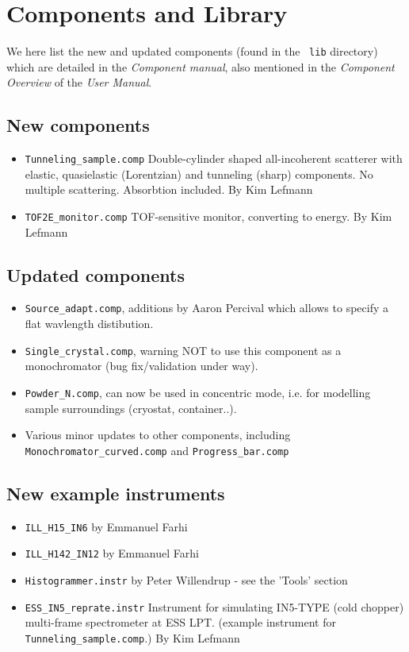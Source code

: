 \section{Components and Library}
\label{s:new-features:components}
 
We here list the new and updated components (found in the \MCS\ \verb+lib+ directory)
which are detailed in the {\it Component manual}, also mentioned in
the {\it Component Overview} of the {\it User Manual}.
\subsection{New components}
\begin{itemize}
\item \verb+Tunneling_sample.comp+ Double-cylinder shaped all-incoherent scatterer with elastic, quasielastic (Lorentzian)
  and tunneling (sharp) components. No multiple scattering. Absorbtion included. By Kim Lefmann
\item \verb+TOF2E_monitor.comp+ TOF-sensitive monitor, converting to energy. By Kim Lefmann
\end{itemize}
\subsection{Updated components}
\begin{itemize}
\item \verb+Source_adapt.comp+, additions by Aaron Percival which allows to specify a flat wavlength distibution.
\item \verb+Single_crystal.comp+, warning NOT to use this component as a monochromator (bug fix/validation under way).
\item \verb+Powder_N.comp+, can now be used in concentric mode, i.e. for modelling sample surroundings (cryostat, container..).
\item Various minor updates to other components, including \verb+Monochromator_curved.comp+ and \verb+Progress_bar.comp+
\end{itemize}
\subsection{New example instruments}
\begin{itemize}
  \item \verb+ILL_H15_IN6+ by Emmanuel Farhi
  \item \verb+ILL_H142_IN12+ by Emmanuel Farhi
  \item \verb+Histogrammer.instr+ by Peter Willendrup - see the 'Tools' section
  \item \verb+ESS_IN5_reprate.instr+ Instrument for simulating IN5-TYPE (cold chopper) multi-frame spectrometer at ESS LPT.
    (example instrument for \verb+Tunneling_sample.comp+.) By  Kim Lefmann
\end{itemize}
